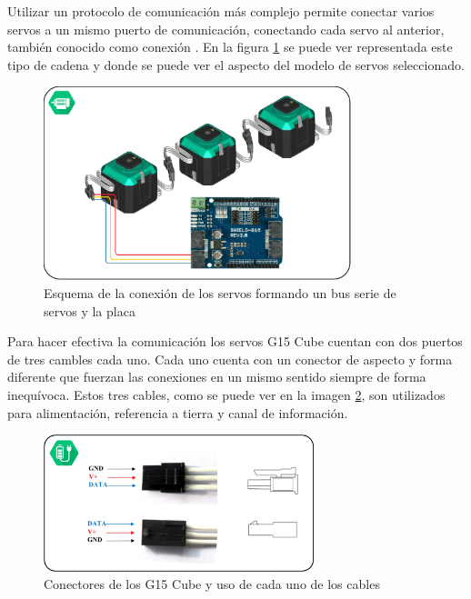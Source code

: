    Utilizar un protocolo de comunicación más complejo permite conectar varios servos a un mismo puerto de comunicación, conectando cada servo al anterior, también conocido como conexión . En la figura \ref{fig:Electronica:bus-servos} se puede ver representada este tipo de cadena y donde se puede ver el aspecto del modelo de servos seleccionado.
    \\

    \begin{figure}[H]
    	\centering
    	\includegraphics[width=0.8\textwidth]{figuras/Imagenes_Electronica/G15_bus_conection.jpg}
    	\caption{Esquema de la conexión de los servos formando un bus serie de servos y la placa }
    	\label{fig:Electronica:bus-servos}
    \end{figure}

    Para hacer efectiva la comunicación los servos G15 Cube cuentan con dos puertos de tres cambles cada uno. Cada uno cuenta con un conector de aspecto y forma diferente que fuerzan las conexiones en un mismo sentido siempre de forma inequívoca. Estos tres cables, como se puede ver en la imagen \ref{fig:Electronica:conectores-servos}, son utilizados para alimentación, referencia a tierra y canal de información.
    \\

    \begin{figure}[H]
    	\centering
    	\includegraphics[width=0.7\textwidth]{figuras/Imagenes_Electronica/conectores_servos.jpg}
    	\caption{Conectores de los G15 Cube y uso de cada uno de los cables}
    	\label{fig:Electronica:conectores-servos}
    \end{figure}

